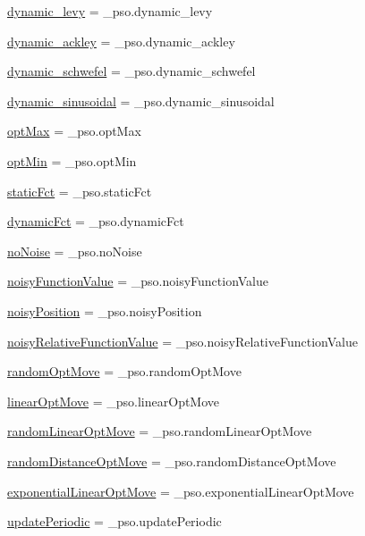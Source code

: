 \begin{CompactItemize}
\item 
\hyperlink{namespacepso_28ec92c18e6d18cf9178b5f98854fd49}{dynamic\_\-levy} = \_\-pso.dynamic\_\-levy
\item 
\hyperlink{namespacepso_d1eda6b4a83315f3645e223170b47d78}{dynamic\_\-ackley} = \_\-pso.dynamic\_\-ackley
\item 
\hyperlink{namespacepso_d0048d5692a9e447a8e519ef683d9ca1}{dynamic\_\-schwefel} = \_\-pso.dynamic\_\-schwefel
\item 
\hyperlink{namespacepso_6e7955521d5991d72afc2b45f96f8689}{dynamic\_\-sinusoidal} = \_\-pso.dynamic\_\-sinusoidal
\item 
\hyperlink{namespacepso_63b4c58e3bbc7770220e0247ec2940fb}{optMax} = \_\-pso.optMax
\item 
\hyperlink{namespacepso_64b7c2dbbf0fa12522013ab6c3243bee}{optMin} = \_\-pso.optMin
\item 
\hyperlink{namespacepso_5c6476b42f90dde7ab334cbb6706e43a}{staticFct} = \_\-pso.staticFct
\item 
\hyperlink{namespacepso_eaef698226ee43888595b4689de708ee}{dynamicFct} = \_\-pso.dynamicFct
\item 
\hyperlink{namespacepso_3ed42a0d68c0db8bc6613d3b4b1821ed}{noNoise} = \_\-pso.noNoise
\item 
\hyperlink{namespacepso_959d295f481209db162c45ce9ebbd007}{noisyFunctionValue} = \_\-pso.noisyFunctionValue
\item 
\hyperlink{namespacepso_a00e8f003f68f505474c2c3897092722}{noisyPosition} = \_\-pso.noisyPosition
\item 
\hyperlink{namespacepso_d1b7b834516afd0c08c36d0f4726de88}{noisyRelativeFunctionValue} = \_\-pso.noisyRelativeFunctionValue
\item 
\hyperlink{namespacepso_d0243c5ff75f80c10e305455eef942ec}{randomOptMove} = \_\-pso.randomOptMove
\item 
\hyperlink{namespacepso_30a965488f96d12d3344efafe39fb77e}{linearOptMove} = \_\-pso.linearOptMove
\item 
\hyperlink{namespacepso_99779901f17d1e9140bc84d718d3b3b5}{randomLinearOptMove} = \_\-pso.randomLinearOptMove
\item 
\hyperlink{namespacepso_4c125c7056259833e78ecd98ab9c05f5}{randomDistanceOptMove} = \_\-pso.randomDistanceOptMove
\item 
\hyperlink{namespacepso_45a31f10e8595a3d9ac89f76b52886e5}{exponentialLinearOptMove} = \_\-pso.exponentialLinearOptMove
\item 
\hyperlink{namespacepso_8f17d13a72a14e5dcca6538e168f02ba}{updatePeriodic} = \_\-pso.updatePeriodic

\end{CompactItemize}
